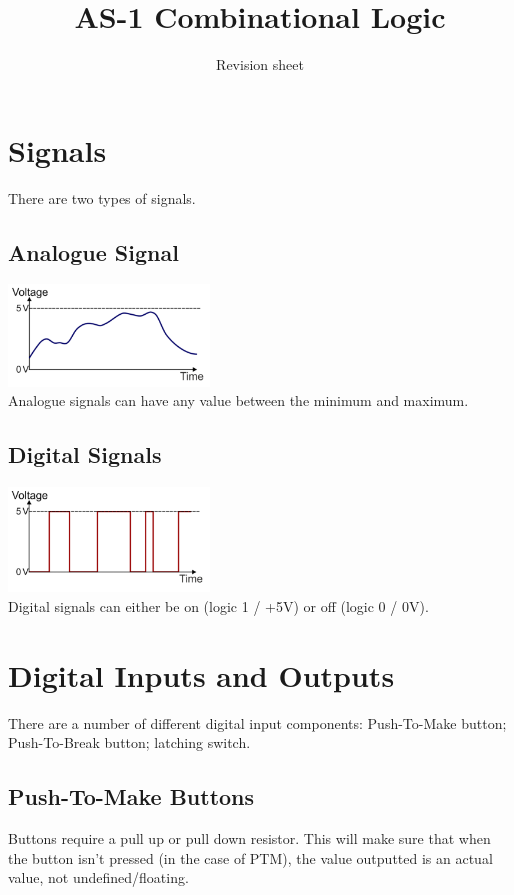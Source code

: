 \documentclass[a4paper,11pt, twocolumn]{article}
\title{AS-1 Combinational Logic}
\author{Revision sheet}
\date{}
\begin{document}
\maketitle
\thispagestyle{fancy}


\section{Signals}
There are two types of signals.
\subsection{Analogue Signal}
\includegraphics[width=0.4\textwidth]{analogueGraph.PNG}\\
Analogue signals can have any value between the minimum and maximum.
\subsection{Digital Signals}
\includegraphics[width=0.4\textwidth]{digitalGraph.PNG}\\
Digital signals can either be on (logic 1 / +5V) or off (logic 0 / 0V).

\section{Digital Inputs and Outputs}
There are a number of different digital input components: Push-To-Make button; Push-To-Break button; latching switch. 
\subsection{Push-To-Make Buttons}
Buttons require a pull up or pull down resistor. This will make sure that when the button isn't pressed (in the case of PTM), the value outputted is an actual value, not undefined/floating.
\end{document}
